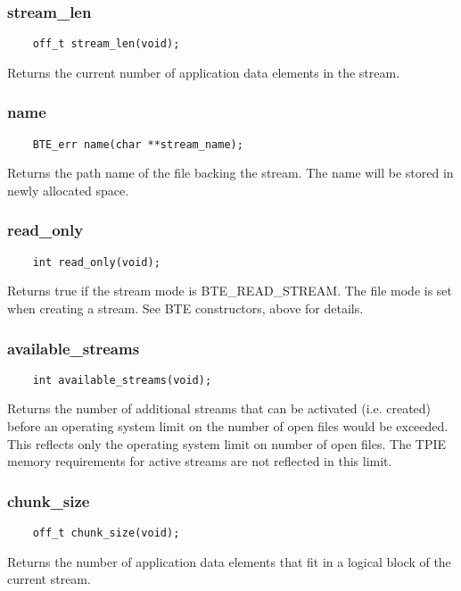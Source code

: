 \subsubsection{stream\_len}
\begin{verbatim}
    off_t stream_len(void);
\end{verbatim}
Returns the current number of application data elements in the stream.


\subsubsection{name}
\begin{verbatim}
    BTE_err name(char **stream_name);
\end{verbatim}
Returns the path name of the file backing the stream. The name will be
stored in newly allocated space.

\subsubsection{read\_only}
\begin{verbatim}
    int read_only(void);
\end{verbatim}
Returns true if the stream mode is BTE\_READ\_STREAM. The file mode
is set when creating a
stream. See BTE constructors, above for details.

\subsubsection{available\_streams}
\begin{verbatim}
    int available_streams(void);    
\end{verbatim}
Returns the number of additional streams that can be
activated (i.e. created) before an
operating system limit on the number of open files would be
exceeded. This reflects only the operating system limit on
number of open files. The TPIE memory requirements for
active streams are not reflected in this limit.

\subsubsection{chunk\_size}
\begin{verbatim}
    off_t chunk_size(void);
\end{verbatim}
Returns the number of application data elements that fit in
a logical block of the current stream.

